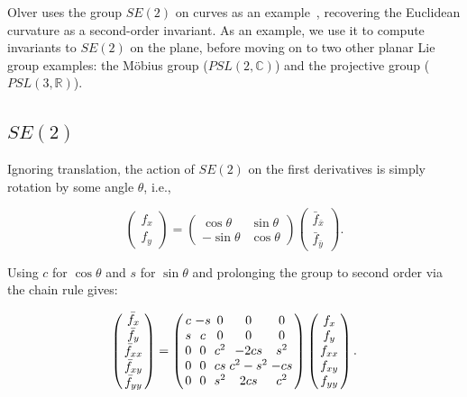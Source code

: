 \documentclass[review,onefignum,onetabnum]{siamonline190516}
\begin{document}
Olver uses the group $SE(2)$ on curves as an example~\cite{Olver}, recovering the Euclidean curvature as a second-order invariant. As an example, we use it to compute invariants to $SE(2)$ on the plane, before moving on to two other planar Lie group examples: the M\"obius group ($PSL(2,\mathbb{C})$) and the projective group ($PSL(3,\mathbb{R})$). 

\subsection{$SE(2)$}

Ignoring translation, the action of $SE(2)$ on the first derivatives is simply rotation by some angle $\theta$, i.e., 

\begin{equation}
\left( \begin{array}{c} f_x \\ f_y \end{array} \right) = \left( \begin{array}{cc} \cos \theta & \sin \theta \\ - \sin \theta & \cos \theta \end{array} \right) \left( \begin{array}{c} \bar f_{\bar x} \\ \bar f_{\bar y} \end{array} \right).
\end{equation}

Using $c$ for $\cos \theta$ and $s$ for $\sin \theta$ and prolonging the group to second order via the chain rule gives:

\begin{equation}
\arraycolsep=1.4pt
\left(
\begin{array}{c}
  \bar f_x \\ \bar f_y \\ \bar f_{xx} \\ \bar f_{xy} \\ \bar f_{yy} 
 \end{array}
 \right)
 = 
\left(
\begin{array}{ccccc}
 c & -s & 0 & 0 & 0 \\
 s & c & 0 & 0 & 0 \\
0 & 0 & c^2 & -2cs & s^2 \\
0 & 0 & cs & c^2 - s^2 & -cs \\
0 & 0 & s^2 & 2cs & c^2 \\
\end{array}
\right)\left(
\begin{array}{c}
f_x \\ f_y \\ f_{xx} \\ f_{xy} \\ f_{yy} 
 \end{array}
 \right).
\label{eqn:SE2}
 \end{equation}
\end{document}
